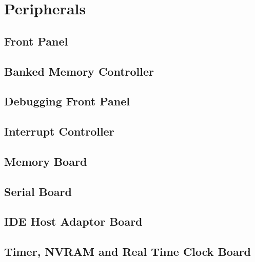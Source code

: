 \ifdefined\renderpartperipherals
\part{Peripherals}
  \ifdefined\renderchappfp
    \chapter{Front Panel}
    \glsresetall
    
  \fi

  \ifdefined\renderchapmbu
    \chapter{Banked Memory Controller}
    \glsresetall
  \fi

  \ifdefined\renderchapdfp
    \chapter{Debugging Front Panel}
    \glsresetall
    
  \fi

  \ifdefined\renderchapirc
    \chapter{Interrupt Controller}
    \glsresetall
    
  \fi

  \ifdefined\renderchapmem
    \chapter{Memory Board}
    \glsresetall
    
  \fi

  \ifdefined\renderchaptty
    \chapter{Serial Board}
    \glsresetall
  \fi

  \ifdefined\renderchapide
    \chapter{IDE Host Adaptor Board}
    \glsresetall
  \fi

  \ifdefined\renderchaptnr
    \chapter{Timer, NVRAM and Real Time Clock Board}
    \glsresetall
  \fi

